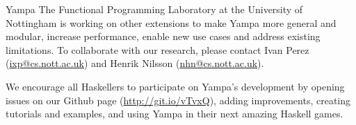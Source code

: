 \begin{hcarentry}[updated]{Yampa}
The Functional Programming Laboratory at the University of Nottingham is
working on other extensions to make Yampa more general and modular, increase
performance, enable new use cases and address existing limitations. To
collaborate with our research, please contact Ivan Perez
(\href{mailto:ixp@cs.nott.ac.uk}{ixp@cs.nott.ac.uk}) and Henrik Nilsson
(\href{mailto:nhn@cs.nott.ac.uk}{nhn@cs.nott.ac.uk}).

We encourage all Haskellers to participate on Yampa's development by opening
issues on our Github page (\href{http://git.io/vTvxQ}{http://git.io/vTvxQ}),
adding improvements, creating tutorials and examples, and using Yampa in their
next amazing Haskell games.
\end{hcarentry}
